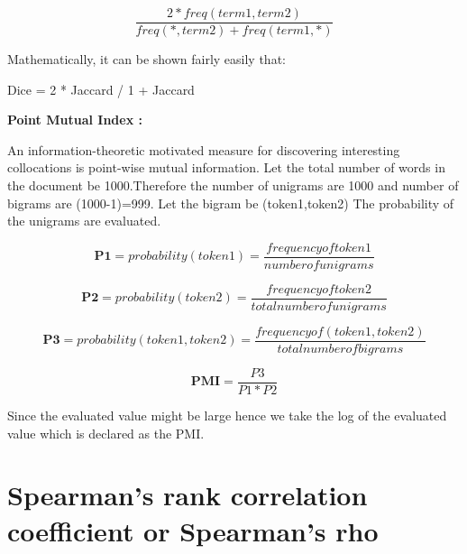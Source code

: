 \documentclass{mnnit}
\begin{document}
  \[          \frac{2 * freq(term1, term2)}{freq( * , term2) + freq(term1, * )}         
                   \] 
                    
           
            
            
            
               

\noindent Mathematically, it can be shown fairly easily that:

\noindent Dice           =           2 * Jaccard / 1 + Jaccard


\noindent \textbf{Point Mutual Index :}

\noindent An information-theoretic motivated measure for discovering interesting collocations is point-wise mutual information. 
\newline
\noindent Let the total number of words in the document be 1000.Therefore the number of unigrams are 1000 and number of bigrams are (1000-1)=999.
Let the bigram be (token1,token2)
The probability of the unigrams are evaluated.






\[
\textbf{P1} = probability(token1) 	=\frac{frequency  of  token1}{number  of  unigrams} 
	\]				         								     

\[
\textbf{P2} = probability(token2)	=\frac{frequency of token2}{total number of unigrams}	\]						      
	


\[
\textbf{P3} = probability(token1,token2)=\frac{frequency of(token1,token2)}{total number of bigrams} 
		                   				          \]		        
			  			   		    
			  			   		    
			  			   
\[
\textbf{PMI} 	= \frac{P3}{ P1 * P2}   \]         								 
           					
                   						
                   						
                   						
                   						
                   							 


\noindent Since the evaluated value might be large hence we take the log of the evaluated value which is declared as the PMI.

\newpage

\section{Spearman's rank correlation coefficient or Spearman's rho}
\end{document}
